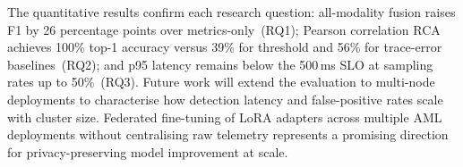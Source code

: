 \documentclass[a4paper]{lipics-v2021}
\begin{document}
The quantitative results confirm each research question: all-modality fusion raises
F1 by 26 percentage points over metrics-only~(RQ1); Pearson correlation RCA achieves
100\% top-1 accuracy versus 39\% for threshold and 56\% for trace-error
baselines~(RQ2); and p95 latency remains below the 500\,ms SLO at sampling rates up
to 50\%~(RQ3). Future work will extend the evaluation to multi-node deployments to
characterise how detection latency and false-positive rates scale with cluster size.
Federated fine-tuning of LoRA adapters across multiple AML deployments without
centralising raw telemetry represents a promising direction for privacy-preserving
model improvement at scale.


\end{document}
